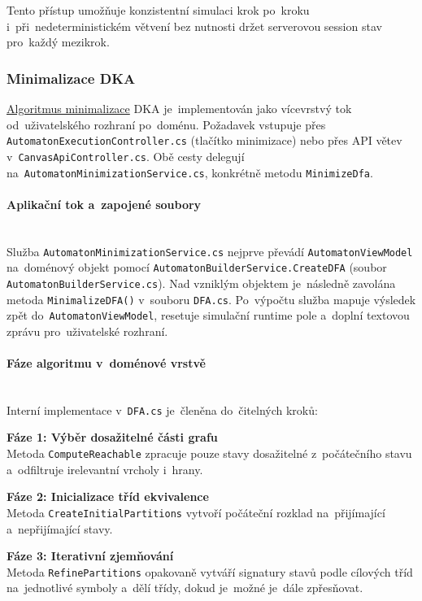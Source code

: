 \documentclass[
  master,
  program=ainfvs,
  printversion,
  figures=false,
  tables=false,
  glossaries,
  index
]{kidiplom}
\begin{document}
Tento přístup umožňuje konzistentní simulaci krok po~kroku i~při~nedeterministickém větvení bez nutnosti držet serverovou session stav pro~každý mezikrok.

\subsubsection{Minimalizace DKA}
\hyperref[par:minimalize]{Algoritmus minimalizace} \gls{DKA} je~implementován jako vícevrstvý tok od~uživatelského rozhraní po~doménu. Požadavek vstupuje přes \texttt{Au\-to\-ma\-ton\-E\-xe\-cu\-ti\-on\-Con\-tro\-ller.cs} (tlačítko minimizace) nebo přes API větev v~\texttt{Canvas\-Api\-Con\-tro\-ller.cs}. Obě cesty delegují na~\texttt{AutomatonMinimization\-Ser\-vi\-ce\-.cs}, konkrétně metodu \texttt{MinimizeDfa}.

\paragraph{Aplikační tok a~zapojené soubory} \mbox{} \\
Služba \texttt{AutomatonMinimizationService.cs} nejprve převádí \texttt{Au\-to\-ma\-ton\-View\-Model} na~doménový objekt pomocí \texttt{AutomatonBuilderServi\-ce.\-Cre\-ateDFA} (soubor \texttt{AutomatonBuilderService.cs}). Nad vzniklým objektem je~následně zavolána metoda \texttt{MinimalizeDFA()} v~souboru \texttt{DFA.cs}. Po~výpočtu služba mapuje výsledek zpět do~\texttt{AutomatonViewModel}, resetuje simulační runtime pole a~doplní textovou zprávu pro~uživatelské rozhraní.

\paragraph{Fáze algoritmu v~doménové vrstvě} \mbox{} \\
Interní implementace v~\texttt{DFA.cs} je~členěna do~čitelných kroků:

\textbf{Fáze 1: Výběr dosažitelné části grafu} \\
Metoda \texttt{ComputeReachable} zpracuje pouze stavy dosažitelné z~počátečního stavu a~odfiltruje irelevantní vrcholy i~hrany.

\textbf{Fáze 2: Inicializace tříd ekvivalence} \\
Metoda \texttt{CreateInitialPartitions} vytvoří počáteční rozklad na~přijímající a~nepřijímající stavy.

\textbf{Fáze 3: Iterativní zjemňování} \\
Metoda \texttt{RefinePartitions} opakovaně vytváří signatury stavů podle cílových tříd na~jednotlivé symboly a~dělí třídy, dokud je~možné je~dále zpřesňovat.
\end{document}
